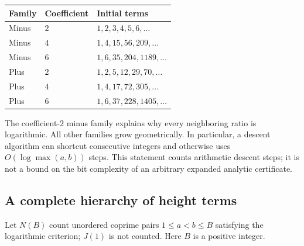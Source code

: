 \documentclass[11pt]{article}
\numberwithin{equation}{section}
\theoremstyle{definition}
\theoremstyle{remark}
\begin{document}
\begin{center}
\begin{tabular}{lll}
\toprule
Family & Coefficient & Initial terms\\
\midrule
Minus & $2$ & $1,2,3,4,5,6,\ldots$\\
Minus & $4$ & $1,4,15,56,209,\ldots$\\
Minus & $6$ & $1,6,35,204,1189,\ldots$\\
Plus & $2$ & $1,2,5,12,29,70,\ldots$\\
Plus & $4$ & $1,4,17,72,305,\ldots$\\
Plus & $6$ & $1,6,37,228,1405,\ldots$\\
\bottomrule
\end{tabular}
\end{center}

The coefficient-$2$ minus family explains why every neighboring ratio
is logarithmic. All other families grow geometrically. In particular,
a descent algorithm can shortcut consecutive integers and otherwise
uses $O(\log\max(a,b))$ steps. This statement counts arithmetic descent
steps; it is not a bound on the bit complexity of an arbitrary expanded
analytic certificate.

\subsection{A complete hierarchy of height terms}

Let $N(B)$ count unordered coprime pairs $1\le a<b\le B$ satisfying the
logarithmic criterion; $J(1)$ is not counted. Here $B$ is a positive
integer.
\end{document}
